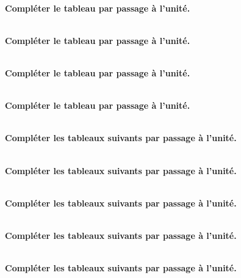 \newpage
\phantom{0}

\exercice \diff[1] \\
\textbf{Compléter le tableau par passage à l'unité.}

\exercice \diff[1] \\
\textbf{Compléter le tableau par passage à l'unité.}

\exercice \diff[1] \\
\textbf{Compléter le tableau par passage à l'unité.}

\exercice \diff[1] \\
\textbf{Compléter le tableau par passage à l'unité.}

\newpage

\exercice \diff[3] \\
\textbf{Compléter les tableaux suivants par passage à l'unité.}
\mc{
\cntr{

}
\cntr{

}}

\exercice \diff[3] \\
\textbf{Compléter les tableaux suivants par passage à l'unité.}
\mc{
\cntr{

}
\cntr{

}}

\exercice \diff[3] \\
\textbf{Compléter les tableaux suivants par passage à l'unité.}
\mc{
\cntr{

}
\cntr{

}}

\exercice \diff[3] \\
\textbf{Compléter les tableaux suivants par passage à l'unité.}
\mc{
\cntr{

}
\cntr{

}}

\exercice \diff[4] \\
\textbf{Compléter les tableaux suivants par passage à l'unité.}
\mc{
\cntr{

}
\cntr{

}}




